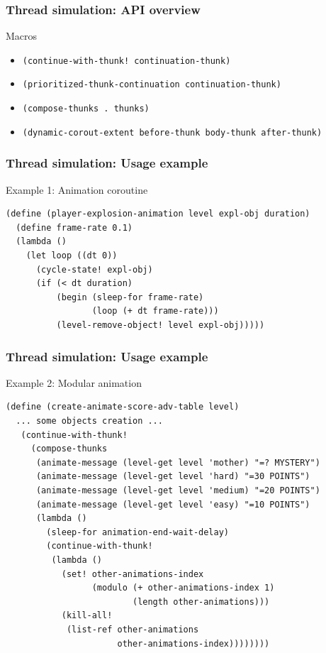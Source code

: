 \documentclass{beamer}
\newcommand{\<}[1]{\`#1}
\begin{document}
\begin{frame}
  \frametitle{Thread simulation: API overview}

  \begin{block}{Macros}
    \begin{itemize}
    \item \texttt{(continue-with-thunk! continuation-thunk)}
    \item \texttt{(prioritized-thunk-continuation continuation-thunk)}
    \item \texttt{(compose-thunks . thunks)}
    \item \texttt{(dynamic-corout-extent before-thunk body-thunk after-thunk)}
    \end{itemize}
  \end{block}

\end{frame}


\begin{frame}[fragile]
  \frametitle{Thread simulation: Usage example}
  \begin{block}{Example 1: Animation coroutine}
    \begin{lstlisting}[basicstyle=\footnotesize]
(define (player-explosion-animation level expl-obj duration)
  (define frame-rate 0.1)
  (lambda ()
    (let loop ((dt 0))
      (cycle-state! expl-obj)
      (if (< dt duration)
          (begin (sleep-for frame-rate)
                 (loop (+ dt frame-rate)))
          (level-remove-object! level expl-obj)))))
    \end{lstlisting}
    \end{block}
\end{frame}

\begin{frame}[fragile]
  \frametitle{Thread simulation: Usage example}
  \begin{block}{Example 2: Modular animation}
    \begin{lstlisting}[basicstyle=\footnotesize]
(define (create-animate-score-adv-table level)
  ... some objects creation ...
   (continue-with-thunk!
     (compose-thunks
      (animate-message (level-get level 'mother) "=? MYSTERY")
      (animate-message (level-get level 'hard) "=30 POINTS")
      (animate-message (level-get level 'medium) "=20 POINTS")
      (animate-message (level-get level 'easy) "=10 POINTS")
      (lambda ()
        (sleep-for animation-end-wait-delay)
        (continue-with-thunk!
         (lambda ()
           (set! other-animations-index
                 (modulo (+ other-animations-index 1)
                         (length other-animations)))
           (kill-all!
            (list-ref other-animations
                      other-animations-index))))))))
    \end{lstlisting}
    \end{block}
\end{frame}
\end{document}
